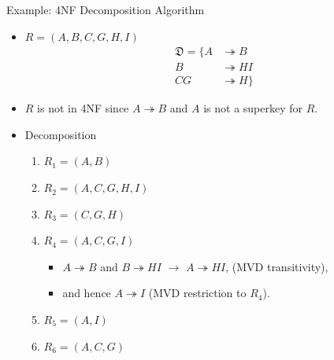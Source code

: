 \documentclass[aspectratio=169]{beamer}
\begin{document}
\begin{frame}{Example: 4NF Decomposition Algorithm}
    \footnotesize
    \begin{itemize}
        \item $R =(A, B, C, G, H, I)$ \\
            \begin{equation*}
                \begin{align*}
                    \mathfrak{D} = \{  A  &\twoheadrightarrow B  \\
                            B  &\twoheadrightarrow HI \\
                            CG &\twoheadrightarrow H \}
                \end{align*}
            \end{equation*}

        \item $R$ is not in 4NF since $A \twoheadrightarrow B$ and $A$ is not a superkey for $R$.

        \item Decomposition
            \begin{enumerate}
                \item $R_1 = (A, B)$            \quad [$R_1$ is in 4NF] \pause
                \item $R_2 = (A, C, G, H, I)$    \pause
                \item $R_3 = (C, G, H)$         \quad [$R_3$ is in 4NF] \pause
                \item $R_4 = (A, C, G, I)$       \pause
                    \begin{itemize}
                        \item $A \twoheadrightarrow B$ and $B \twoheadrightarrow HI$ $\longrightarrow$ $A \twoheadrightarrow HI$, (MVD transitivity),
                        \item and hence $A \twoheadrightarrow I$ (MVD restriction to $R_4$). \pause
                    \end{itemize}
                \item $R_5 = (A, I)$            \quad [$R_5$ is in 4NF] \pause
                \item $R_6 = (A, C, G)$         \quad [$R_6$ is in 4NF]
            \end{enumerate}
    \end{itemize}
\end{frame}
\end{document}
